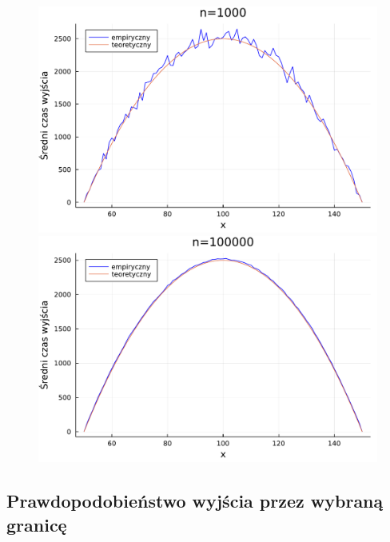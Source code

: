 \documentclass{article}
\theoremstyle{break}
\numberwithin{equation}{subsection}
\numberwithin{figure}{section}
\begin{document}
\begin{figure}[H]
	\begin{multicols}{2}
		\begin{center}
			\includegraphics[scale=0.30]{time100poly.pdf}
			\caption{}
			\label{fig:33}
			\includegraphics[scale=0.30]{time100000poly.pdf}
			\caption{}
			\label{fig:44}
		\end{center}
	\end{multicols}
\end{figure}

\subsection{Prawdopodobieństwo wyjścia przez wybraną granicę}
\end{document}
